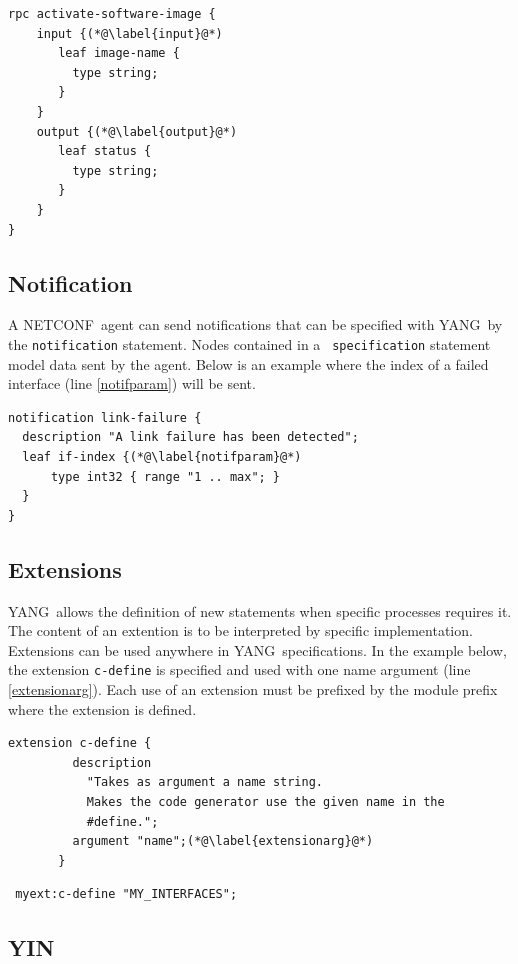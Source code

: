 \documentclass[a4paper]{article}
\newcommand{\nc}{NETCONF}
\newcommand{\y}{YANG}
\begin{document}
\begin{lstlisting}
rpc activate-software-image {
    input {(*@\label{input}@*)
       leaf image-name {
         type string;
       }
    }
    output {(*@\label{output}@*)
       leaf status {
         type string;
       }
    }
}
\end{lstlisting}

\subsection{Notification}

A \nc\ agent can send notifications  that can be specified with \y\ by
the  {\tt   notification}  statement.   Nodes  contained   in  a  {\tt
specification} statement  model data sent  by the agent.  Below  is an
example where the index  of a failed interface (line \ref{notifparam})
will be sent.

\begin{lstlisting} 
notification link-failure {
  description "A link failure has been detected";
  leaf if-index {(*@\label{notifparam}@*)
      type int32 { range "1 .. max"; }
  }
}
\end{lstlisting}

\subsection{Extensions}

\y\ allows  the definition of  new statements when  specific processes
requires  it. The  content of  an extention  is to  be  interpreted by
specific  implementation.   Extensions can  be  used  anywhere in  \y\
specifications. In the example  below, the extension {\tt c-define} is
specified and  used with one name  argument (line \ref{extensionarg}).
Each use of  an extension must be prefixed by  the module prefix where
the extension is defined.

\begin{lstlisting}
extension c-define {
         description
           "Takes as argument a name string.
           Makes the code generator use the given name in the
           #define.";
         argument "name";(*@\label{extensionarg}@*)
       }
\end{lstlisting}

\begin{lstlisting}
 myext:c-define "MY_INTERFACES";
\end{lstlisting}


\subsection{YIN}
\end{document}
